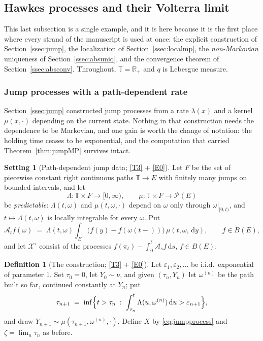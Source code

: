 \documentclass[11pt,a4paper]{article}
\theoremstyle{plain}
\theoremstyle{definition}
\newtheorem{definition}[theorem]{Definition}
\newtheorem{setting}[theorem]{Setting}
\theoremstyle{remark}
\newcommand{\R}{\mathbb{R}}
\newcommand{\Rp}{\R_+}
\newcommand{\T}{\mathbb{T}}                     %
\newcommand{\Bdd}{B}                           %
\newcommand{\Prob}{\mathcal{P}}                %
\newcommand{\XX}{\mathcal{X}}                  %
\newcommand{\dif}{\,\mathrm{d}}
\begin{document}
\subsection{Hawkes processes and their Volterra limit}
\label{ssec:hawkes}

This last subsection is a single example, and it is here because it is the first
place where every strand of the manuscript is used at once: the explicit
construction of Section~\ref{ssec:jump}, the localization of
Section~\ref{ssec:localmp}, the \emph{non-Markovian} uniqueness of
Section~\ref{ssec:absuniq}, and the convergence theorem of
Section~\ref{ssec:absconv}.  Throughout, $\T = \Rp$ and $q$ is Lebesgue measure.

\subsubsection*{Jump processes with a path-dependent rate}

Section~\ref{ssec:jump} constructed jump processes from a rate $\lambda(x)$ and a
kernel $\mu(x,\cdot)$ depending on the current state.  Nothing in that
construction needs the dependence to be Markovian, and one gain is worth the
change of notation: the holding time ceases to be exponential, and the
computation that carried Theorem~\ref{thm:jumpMP} survives intact.

\begin{setting}[Path-dependent jump data; \eqref{T3} + \eqref{E0}]
  \label{set:pathjump}
  Let $F$ be the set of piecewise constant right continuous paths $\T \to E$ with
  finitely many jumps on bounded intervals, and let
  \[
    \Lambda : \T \times F \to [0,\infty) ,
    \qquad
    \mu : \T \times F \to \Prob(E)
  \]
  be \emph{predictable}: $\Lambda(t,\omega)$ and $\mu(t,\omega,\cdot)$ depend on
  $\omega$ only through $\omega|_{[0,t)}$, and $t \mapsto \Lambda(t,\omega)$ is
  locally integrable for every $\omega$.  Put
  \begin{equation}
    \label{eq:pathgen}
    \mathcal{A}_t f(\omega)
      \;=\; \Lambda(t,\omega) \int_E
        \bigl( f(y) - f(\omega(t-)) \bigr) \, \mu(t,\omega,\dif y) ,
    \qquad f \in \Bdd(E) ,
  \end{equation}
  and let $\XX^\circ$ consist of the processes
  $f(\pi_t) - \int_0^t \mathcal{A}_s f \dif s$, $f \in \Bdd(E)$.
\end{setting}

\begin{definition}[The construction; \eqref{T3} + \eqref{E0}]
  \label{def:pathjumpconstruction}
  Let $\varepsilon_1,\varepsilon_2,\dots$ be i.i.d.\ exponential of parameter $1$.
  Set $\tau_0 = 0$, let $Y_0 \sim \nu$, and given $(\tau_n, Y_n)$ let
  $\omega^{(n)}$ be the path built so far, continued constantly at $Y_n$; put
  \begin{equation}
    \label{eq:pathjumptime}
    \tau_{n+1} \;=\; \inf\Bigl\{ t > \tau_n \;:\;
      \int_{\tau_n}^{t} \Lambda(u,\omega^{(n)}) \dif u > \varepsilon_{n+1} \Bigr\} ,
  \end{equation}
  and draw $Y_{n+1} \sim \mu(\tau_{n+1},\omega^{(n)},\cdot)$.  Define $X$ by
  \eqref{eq:jumpprocess} and $\zeta = \lim_n \tau_n$ as before.
\end{definition}
\end{document}
